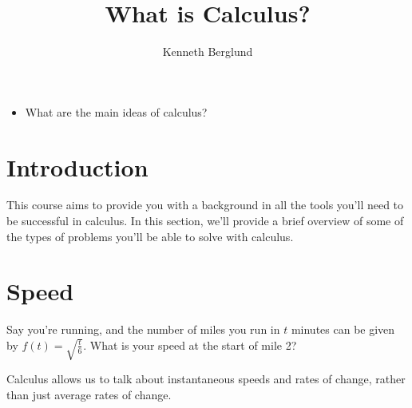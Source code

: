 \documentclass{ximera}
\author{Kenneth Berglund}
\title{What is Calculus?}
\begin{document}
\begin{abstract}
\end{abstract}
\maketitle
%
%
%
\begin{motivatingQuestions}\begin{itemize}
\item What are the main ideas of calculus?
\end{itemize}\end{motivatingQuestions}
%
%
%
\section{Introduction}
%
This course aims to provide you with a background in all the tools you'll need to be successful in calculus. In this section, we'll provide a brief overview of some of the types of problems you'll be able to solve with calculus. 


\section{Speed}
Say you're running, and the number of miles you run in $t$ minutes can be given by $f(t) = \sqrt{\frac{t}{6}}$. What is your speed at  the start of mile 2?

Calculus allows us to talk about instantaneous speeds and rates of change, rather than just average rates of change. 
\end{document}
